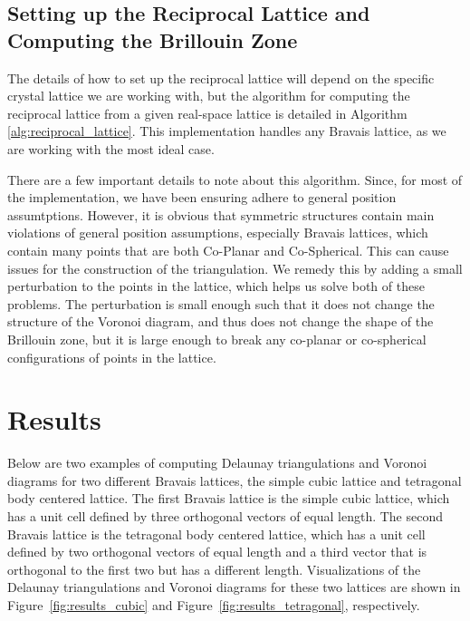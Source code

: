 \documentclass{article}
\begin{document}
\subsection{Setting up the Reciprocal Lattice and Computing the Brillouin Zone}

The details of how to set up the reciprocal lattice will depend on the specific crystal lattice we are working with, but the algorithm for computing the reciprocal lattice from a given real-space lattice is detailed in Algorithm \ref{alg:reciprocal_lattice}. This implementation handles any Bravais lattice, as we are working with the most ideal case.

There are a few important details to note about this algorithm. Since, for most of the implementation, we have been ensuring adhere to general position assumtptions. However, it is obvious that symmetric structures contain main violations of general position assumptions, especially Bravais lattices, which contain many points that are both Co-Planar and Co-Spherical. This can cause issues for the construction of the triangulation. We remedy this by adding a small perturbation to the points in the lattice, which helps us solve both of these problems. The perturbation is small enough such that it does not change the structure of the Voronoi diagram, and thus does not change the shape of the Brillouin zone, but it is large enough to break any co-planar or co-spherical configurations of points in the lattice.

\section{Results}

Below are two examples of computing Delaunay triangulations and Voronoi diagrams for two different Bravais lattices, the simple cubic lattice and tetragonal body centered lattice. The first Bravais lattice is the simple cubic lattice, which has a unit cell defined by three orthogonal vectors of equal length. The second Bravais lattice is the tetragonal body centered lattice, which has a unit cell defined by two orthogonal vectors of equal length and a third vector that is orthogonal to the first two but has a different length. Visualizations of the Delaunay triangulations and Voronoi diagrams for these two lattices are shown in Figure~\ref{fig:results_cubic} and Figure~\ref{fig:results_tetragonal}, respectively. 
\end{document}
